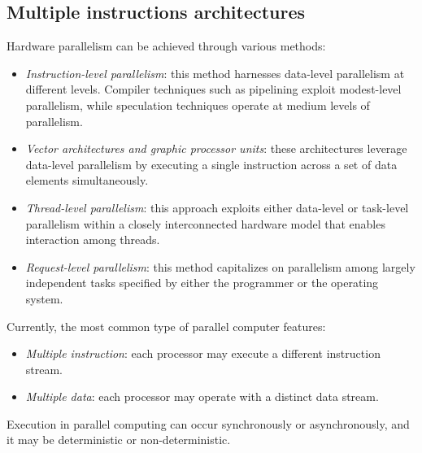 \subsection{Multiple instructions architectures}
Hardware parallelism can be achieved through various methods:
\begin{itemize}
    \item \textit{Instruction-level parallelism}: this method harnesses data-level parallelism at different levels. 
        Compiler techniques such as pipelining exploit modest-level parallelism, while speculation techniques operate at medium levels of parallelism.
    \item \textit{Vector architectures and graphic processor units}: these architectures leverage data-level parallelism by executing a single instruction across a set of data elements simultaneously.
    \item \textit{Thread-level parallelism}: this approach exploits either data-level or task-level parallelism within a closely interconnected hardware model that enables interaction among threads.
    \item \textit{Request-level parallelism}: this method capitalizes on parallelism among largely independent tasks specified by either the programmer or the operating system.
\end{itemize}
Currently, the most common type of parallel computer features:
\begin{itemize}
    \item \textit{Multiple instruction}: each processor may execute a different instruction stream.
    \item \textit{Multiple data}: each processor may operate with a distinct data stream.
\end{itemize}
Execution in parallel computing can occur synchronously or asynchronously, and it may be deterministic or non-deterministic.

